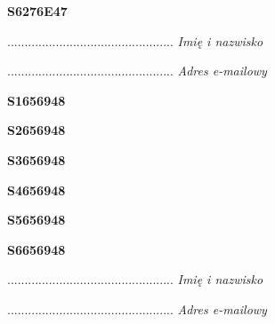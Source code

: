 \begin{turn}{90}\huge \textbf{S6276E47}\end{turn}

\begin{turn}{90}\begin{minipage}{\linewidth} \vspace{20mm} ................................................  \textit{Imię i nazwisko}\end{minipage}\end{turn}

\begin{turn}{90}\begin{minipage}{\linewidth} \vspace{20mm} ................................................  \textit{Adres e-mailowy}\end{minipage}\end{turn}

\begin{turn}{90}\huge \textbf{S1656948}\end{turn}

\begin{turn}{90}\huge \textbf{S2656948}\end{turn}

\begin{turn}{90}\huge \textbf{S3656948}\end{turn}

\begin{turn}{90}\huge \textbf{S4656948}\end{turn}

\begin{turn}{90}\huge \textbf{S5656948}\end{turn}

\begin{turn}{90}\huge \textbf{S6656948}\end{turn}

\begin{turn}{90}\begin{minipage}{\linewidth} \vspace{20mm} ................................................  \textit{Imię i nazwisko}\end{minipage}\end{turn}

\begin{turn}{90}\begin{minipage}{\linewidth} \vspace{20mm} ................................................  \textit{Adres e-mailowy}\end{minipage}\end{turn}

